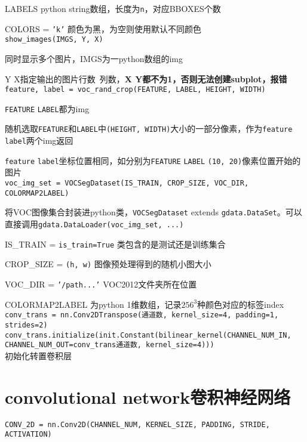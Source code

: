 \documentclass[UTF8]{ctexart}
\begin{document}
  LABELS python string数组，长度为\texttt{n}，对应BBOXES个数

  COLORS = \texttt{'k'} 颜色为黑，为空则使用默认不同颜色\\
\texttt{show\_images(IMGS, Y, X)}

  同时显示多个图片，IMGS为一python数组的img

  Y X指定输出的图片行数\ 列数，\textbf{X Y都不为1，否则无法创建subplot，报错}\\
\texttt{feature, label = voc\_rand\_crop(FEATURE, LABEL, HEIGHT, WIDTH)}

  \texttt{FEATURE} \texttt{LABEL}都为img

  随机选取\texttt{FEATURE}和\texttt{LABEL}中\texttt{(HEIGHT, WIDTH)}大小的一部分像素，作为\texttt{feature} \texttt{label}两个img返回
  
  \texttt{feature} \texttt{label}坐标位置相同，如分别为\texttt{FEATURE} \texttt{LABEL} \texttt{(10, 20)}像素位置开始的图片\\
\texttt{voc\_img\_set = VOCSegDataset(IS\_TRAIN, CROP\_SIZE, VOC\_DIR, COLORMAP2LABEL)}

  将VOC图像集合封装进python类，\texttt{VOCSegDataset} extends \texttt{gdata.DataSet}。可以直接调用\texttt{gdata.DataLoader(voc\_img\_set, ...)}

  IS\_TRAIN = \texttt{is\_train=True} 类包含的是测试还是训练集合

  CROP\_SIZE = \texttt{(h, w)} 图像预处理得到的随机小图大小

  VOC\_DIR = \texttt{'/path...'} VOC2012文件夹所在位置

  COLORMAP2LABEL 为python 1维数组，记录$256^3$种颜色对应的标签index\\
\texttt{conv\_trans = nn.Conv2DTranspose(通道数, kernel\_size=4, padding=1, strides=2)}\\
\texttt{conv\_trans.initialize(init.Constant(bilinear\_kernel(CHANNEL\_NUM\_IN, CHANNEL\_NUM\_OUT=conv\_trans通道数, kernel\_size=4)))}\\

  初始化转置卷积层
\section{convolutional network卷积神经网络}
\noindent \texttt{CONV\_2D = nn.Conv2D(CHANNEL\_NUM, KERNEL\_SIZE, PADDING, STRIDE, ACTIVATION)}
\end{document}
